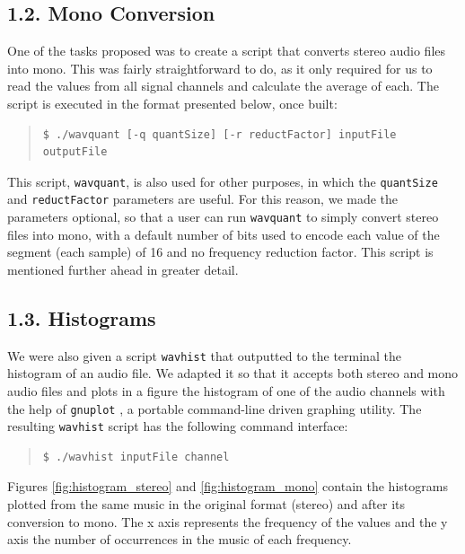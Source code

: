 \documentclass[12pt]{article}
\begin{document}
\subsection*{1.2. Mono Conversion}

One of the tasks proposed was to create a script that converts stereo audio 
files into mono.
This was fairly straightforward to do, as it only required for us to read the values 
from all signal channels and calculate the average of each.
The script is executed in the format presented below, once built:

\begingroup
\addtolength\leftmargini{-0.4in}
\begin{quote}
\begin{verbatim}
$ ./wavquant [-q quantSize] [-r reductFactor] inputFile outputFile
\end{verbatim}
\end{quote}
\endgroup

This script, \texttt{wavquant}, is also used for other purposes, in which 
the \texttt{quantSize} and \texttt{reductFactor} parameters are useful.
For this reason, we made the parameters optional, so that a user can run 
\texttt{wavquant} to simply convert stereo files into mono, with a default 
number of bits used to encode each value of the segment (each sample) of 16 and 
no frequency reduction factor.
This script is mentioned further ahead in greater detail.

\subsection*{1.3. Histograms}

We were also given a script \texttt{wavhist} that outputted to the terminal 
the histogram of an audio file.
We adapted it so that it accepts both stereo and mono audio files and plots in 
a figure the histogram of one of the audio channels with the help of 
\texttt{gnuplot} \cite{gnuplot}, a portable command-line driven graphing utility. 
The resulting \texttt{wavhist} script has the following command interface:

\begingroup
\addtolength\leftmargini{-0.4in}
\begin{quote}
\begin{verbatim}
$ ./wavhist inputFile channel
\end{verbatim}
\end{quote}
\endgroup

Figures \ref{fig:histogram_stereo} and \ref{fig:histogram_mono} contain the 
histograms plotted from the same music in the original format (stereo) and after 
its conversion to mono. 
The x axis represents the frequency of the values and the y axis the number of 
occurrences in the music of each frequency.
\end{document}
